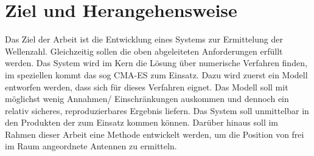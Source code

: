 \section{Ziel und Herangehensweise}
%
Das Ziel der Arbeit ist die Entwicklung eines Systems zur Ermittelung der Wellenzahl. Gleichzeitig sollen die oben abgeleiteten Anforderungen erfüllt werden. Das System wird im Kern die Lösung über numerische Verfahren finden, im speziellen kommt das sog CMA-ES zum Einsatz. Dazu wird zuerst ein Modell entworfen werden, dass sich für dieses Verfahren eignet. Das Modell soll mit möglichst wenig Annahmen/ Einschränkungen auskommen und dennoch ein relativ sicheres, reproduzierbares Ergebnis liefern. Das System soll unmittelbar in den Produkten der \amedogmbh zum Einsatz kommen können. Darüber hinaus soll im Rahmen dieser Arbeit eine Methode entwickelt werden, um die Position von frei im Raum angeordnete Antennen zu ermitteln.
%
